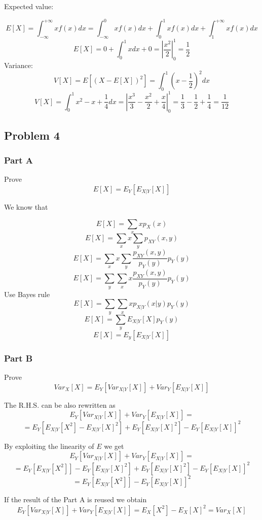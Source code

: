 Expected value:

\[
E\left[X\right]=\int_{-\infty}^{+\infty}xf(x)dx=\int_{-\infty}^{0}xf(x)dx+\int_{0}^{1}xf(x)dx+\int_{1}^{+\infty}xf(x)dx
\]
\[
E\left[X\right]=0+\int_{0}^{1}xdx+0=\left|\frac{x^{2}}{2}\right|_{0}^{1}=\frac{1}{2}
\]
 Variance:
 \[
 V\left[X\right]=E\left[(X-E\left[X\right])^{2}\right]=\int_{0}^{1}\left(x-\frac{1}{2}\right)^{2}dx
 \]
 \[
 V\left[X\right]=\int_{0}^{1}x^{2}-x+\frac{1}{4}dx=\left|\frac{x^{3}}{3}-\frac{x^{2}}{2}+\frac{x}{4}\right|_{0}^{1}=\frac{1}{3}-\frac{1}{2}+\frac{1}{4}=\frac{1}{12}
 \]



\subsection*{Problem 4}

\subsubsection*{Part A}

Prove 
\[
E\left[X\right]=E_{Y}\left[E_{X|Y}\left[X\right]\right]
\]

We know that

\[
E\left[X\right]=\sum_{x}xp_{X}(x)
\]
\[
E\left[X\right]=\sum_{x}x\sum_{y}p_{XY}(x,y)
\]
\[
E\left[X\right]=\sum_{x}x\sum_{y}\frac{p_{XY}(x,y)}{p_{Y}(y)}p_{Y}(y)
\]
\[
E\left[X\right]=\sum_{y}\sum_{x}x\frac{p_{XY}(x,y)}{p_{Y}(y)}p_{Y}(y)
\]
Use Bayes rule
\[
E\left[X\right]=\sum_{y}\sum_{x}xp_{X|Y}(x|y)p_{Y}(y)
\]
\[
E\left[X\right]=\sum_{y}E_{X|Y}\left[X\right]p_{Y}(y)
\]
\[
E\left[X\right]=E_{y}\left[E_{X|Y}\left[X\right]\right]
\]

\subsubsection*{Part B}

Prove
\[
Var_{X}\left[X\right]=E_{Y}\left[Var_{X|Y}\left[X\right]\right]+Var_{Y}\left[E_{X|Y}\left[X\right]\right]
\]

The R.H.S. can be also rewritten as
\[
E_{Y}\left[Var_{X|Y}\left[X\right]\right]+Var_{Y}\left[E_{X|Y}\left[X\right]\right]=
\]
\[
=E_{Y}\left[E{}_{X|Y}\left[X^{2}\right]-E_{X|Y}\left[X\right]^{2}\right]+E_{Y}\left[E_{X|Y}\left[X\right]^{2}\right]-E_{Y}\left[E_{X|Y}\left[X\right]\right]^{2}
\]

By exploiting the linearity of $E$ we get
\[
E_{Y}\left[Var_{X|Y}\left[X\right]\right]+Var_{Y}\left[E_{X|Y}\left[X\right]\right]=
\]
\[
=E_{Y}\left[E{}_{X|Y}\left[X^{2}\right]\right]-E_{Y}\left[E_{X|Y}\left[X\right]^{2}\right]+E_{Y}\left[E_{X|Y}\left[X\right]^{2}\right]-E_{Y}\left[E_{X|Y}\left[X\right]\right]^{2}
\]
\[
=E_{Y}\left[E{}_{X|Y}\left[X^{2}\right]\right]-E_{Y}\left[E_{X|Y}\left[X\right]\right]^{2}
\]

If the result of the Part A is reused we obtain
\[
E_{Y}\left[Var_{X|Y}\left[X\right]\right]+Var_{Y}\left[E_{X|Y}\left[X\right]\right]=E_{X}\left[X^{2}\right]-E_{X}\left[X\right]^{2}=Var_{X}\left[X\right]
\]



